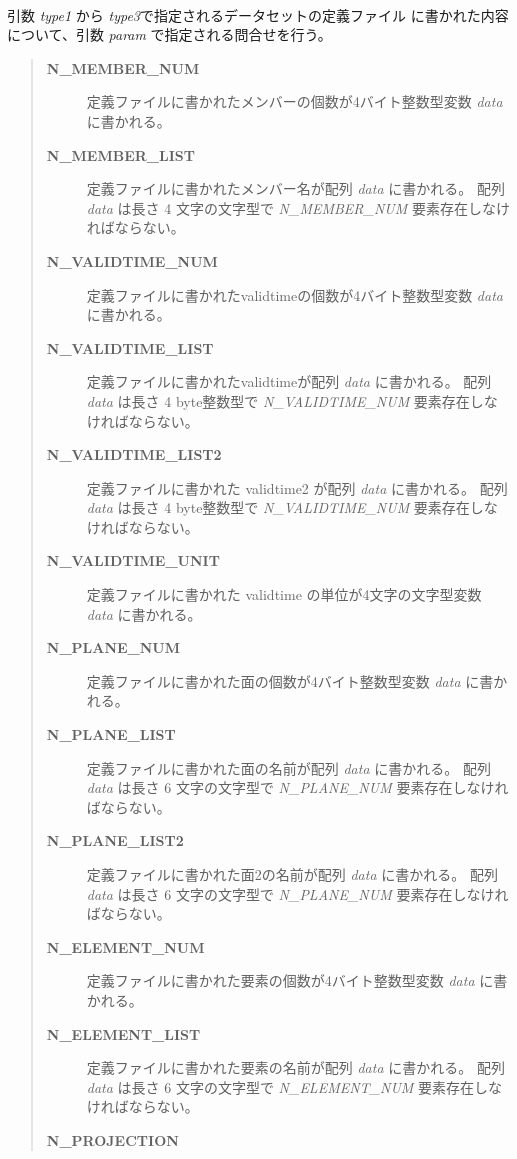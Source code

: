 \paragraph{\FuncDesc}引数 {\it type1} から {\it type3}で指定されるデータセットの定義ファイル
に書かれた内容について、引数 {\it param} で指定される問合せを行う。
\begin{quote}\begin{description}
\item[{\bf N\_MEMBER\_NUM}] 
定義ファイルに書かれたメンバーの個数が4バイト整数型変数 {\it data} に書かれる。
\item[{\bf N\_MEMBER\_LIST}] 
定義ファイルに書かれたメンバー名が配列 {\it data} に書かれる。
配列 {\it data} は長さ 4 文字の文字型で
{\it N\_MEMBER\_NUM} 要素存在しなければならない。
\item[{\bf N\_VALIDTIME\_NUM}] 
定義ファイルに書かれたvalidtimeの個数が4バイト整数型変数 
{\it data} に書かれる。
\item[{\bf N\_VALIDTIME\_LIST}] 
定義ファイルに書かれたvalidtimeが配列 {\it data} に書かれる。
配列 {\it data} は長さ 4 byte整数型で
{\it N\_VALIDTIME\_NUM} 要素存在しなければならない。
\item[{\bf N\_VALIDTIME\_LIST2}] 
定義ファイルに書かれた validtime2 が配列 {\it data} に書かれる。
\newline 配列 {\it data} は長さ 4 byte整数型で
{\it N\_VALIDTIME\_NUM} 要素存在しなければならない。
\item[{\bf N\_VALIDTIME\_UNIT}] 
定義ファイルに書かれた validtime の単位が4文字の文字型変数 {\it data} 
に書かれる。
\item[{\bf N\_PLANE\_NUM}] 
定義ファイルに書かれた面の個数が4バイト整数型変数 {\it data} に書かれる。
\item[{\bf N\_PLANE\_LIST}] 
定義ファイルに書かれた面の名前が配列 {\it data} に書かれる。
配列 {\it data} は長さ 6 文字の文字型で
{\it N\_PLANE\_NUM} 要素存在しなければならない。
\item[{\bf N\_PLANE\_LIST2}] 
定義ファイルに書かれた面2の名前が配列 {\it data} に書かれる。
配列 {\it data} は長さ 6 文字の文字型で
{\it N\_PLANE\_NUM} 要素存在しなければならない。
\item[{\bf N\_ELEMENT\_NUM}] 
定義ファイルに書かれた要素の個数が4バイト整数型変数 {\it data} に書かれる。
\item[{\bf N\_ELEMENT\_LIST}] 
定義ファイルに書かれた要素の名前が配列 {\it data} に書かれる。
配列 {\it data} は長さ 6 文字の文字型で
{\it N\_ELEMENT\_NUM} 要素存在しなければならない。
\item[{\bf  N\_PROJECTION }] 

\end{description}
\end{quote}

